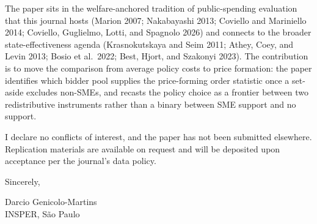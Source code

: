 \documentclass[11pt]{article}
\begin{document}
The paper sits in the welfare-anchored tradition of public-spending
evaluation that this journal hosts (Marion 2007; Nakabayashi 2013;
Coviello and Mariniello 2014; Coviello, Guglielmo, Lotti, and Spagnolo
2026) and connects to the broader state-effectiveness agenda
(Krasnokutskaya and Seim 2011; Athey, Coey, and Levin 2013; Bosio et al.\
2022; Best, Hjort, and Szakonyi 2023). The contribution is to move the
comparison from average policy costs to price formation: the paper
identifies which bidder pool supplies the price-forming order statistic
once a set-aside excludes non-SMEs, and recasts the policy choice as a
frontier between two redistributive instruments rather than a binary
between SME support and no support.

I declare no conflicts of interest, and the paper has not been submitted
elsewhere. Replication materials are available on request and will be
deposited upon acceptance per the journal's data policy.

\medskip

\noindent Sincerely,

\bigskip

\noindent Darcio Genicolo-Martins\\
INSPER, S\~ao Paulo
\end{document}
